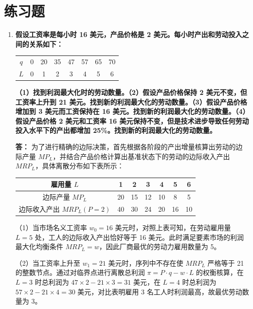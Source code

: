 	\section{练习题}
	\begin{enumerate}[label=\textbf{\arabic*.}, leftmargin=*]
		\item \textbf{假设工资率是每小时 16 美元，产品价格是 2 美元。每小时产出和劳动投入之间的关系如下：}
		\begin{center}
			\small
			\setlength{\tabcolsep}{12pt}
			\renewcommand{\arraystretch}{1.1}
			\begin{tabular}{cccccccc}
				\hline
				$q$ & 0 & 20 & 35 & 47 & 57 & 65 & 70 \\
				$L$ & 0 & 1  & 2  & 3  & 4  & 5  & 6  \\
				\hline
			\end{tabular}
		\end{center}
		\textbf{（1）找到利润最大化时的劳动数量。（2）假设产品价格保持 2 美元不变，但工资率上升到 21 美元。找到新的利润最大化的劳动数量。（3）假设产品价格增加到 3 美元而工资保持在 16 美元。找到新的利润最大化的劳动数量。（4）假设产品价格 2 美元和工资率 16 美元保持不变，但是技术进步导致任何劳动投入水平下的产出都增加 25\%。找到新的利润最大化的劳动数量。}
		
		\textbf{答：}
		为了进行精确的边际决策，首先根据各阶段的产出增量核算出劳动的边际产量 $MP_L$，并结合产品价格计算出基准状态下的劳动的边际收入产出 $MRP_L$，具体离散分布如下表所示：
		\begin{center}
			\small
			\setlength{\tabcolsep}{10pt}
			\renewcommand{\arraystretch}{1.2}
			\begin{tabular}{ccccccc}
				\hline
				雇用量 $L$ & 1 & 2 & 3 & 4 & 5 & 6 \\
				\hline
				边际产量 $MP_L$ & 20 & 15 & 12 & 10 & 8 & 5 \\
				边际收入产出 $MRP_L (P=2)$ & 40 & 30 & 24 & 20 & 16 & 10 \\
				\hline
			\end{tabular}
		\end{center}
		
		（1）当市场名义工资率 $w_0 = 16$ 美元时，对照上表可知，在劳动雇用量 $L = 5$ 处，工人的边际收入产出恰好等于 16 美元。此时满足要素市场的利润最大化均衡条件 $MRP_L = w$，因此厂商最优的劳动力雇用数量为 5。
		
		（2）当工资率上升至 $w_1 = 21$ 美元时，序列中不存在使 $MRP_L$ 严格等于 21 的整数节点。通过对临界点进行离散总利润 $\pi = P \cdot q - w \cdot L$ 的权衡核算，在 $L = 3$ 时总利润为 $47 \times 2 - 21 \times 3 = 31$ 美元，在 $L = 4$ 时总利润为 $57 \times 2 - 21 \times 4 = 30$ 美元，对比表明雇用 3 名工人时利润最高，故最优劳动数量为 3。
		

\end{enumerate}
